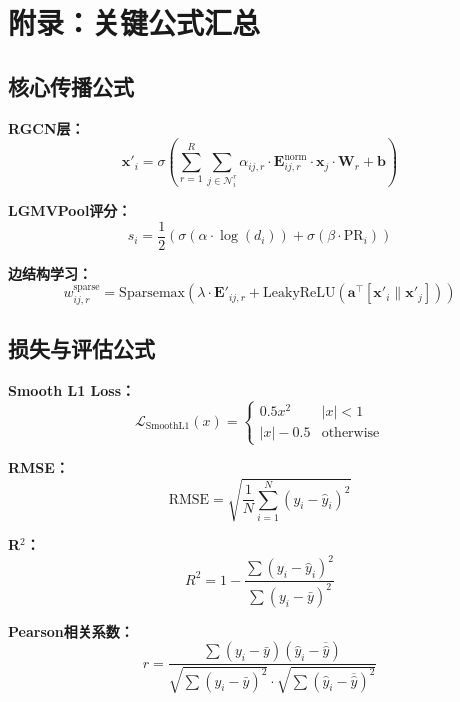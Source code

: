 \section{附录：关键公式汇总}

\subsection{核心传播公式}

\textbf{RGCN层：}
\begin{equation}
\mathbf{x}'_i = \sigma\left( \sum_{r=1}^{R} \sum_{j \in \mathcal{N}_i^r} \alpha_{ij,r} \cdot \mathbf{E}_{ij,r}^{\text{norm}} \cdot \mathbf{x}_j \cdot \mathbf{W}_r + \mathbf{b} \right)
\end{equation}

\textbf{LGMVPool评分：}
\begin{equation}
s_i = \frac{1}{2} \left( \sigma(\alpha \cdot \log(d_i)) + \sigma(\beta \cdot \text{PR}_i) \right)
\end{equation}

\textbf{边结构学习：}
\begin{equation}
w_{ij,r}^{\text{sparse}} = \text{Sparsemax}\left( \lambda \cdot \mathbf{E}'_{ij,r} + \text{LeakyReLU}(\mathbf{a}^{\top}[\mathbf{x}'_i \parallel \mathbf{x}'_j]) \right)
\end{equation}

\subsection{损失与评估公式}

\textbf{Smooth L1 Loss：}
\begin{equation}
\mathcal{L}_{\text{SmoothL1}}(x) = \begin{cases} 0.5 x^2 & |x| < 1 \\ |x| - 0.5 & \text{otherwise} \end{cases}
\end{equation}

\textbf{RMSE：}
\begin{equation}
\text{RMSE} = \sqrt{ \frac{1}{N} \sum_{i=1}^{N} (y_i - \hat{y}_i)^2 }
\end{equation}

\textbf{R$^2$：}
\begin{equation}
R^2 = 1 - \frac{\sum (y_i - \hat{y}_i)^2}{\sum (y_i - \bar{y})^2}
\end{equation}

\textbf{Pearson相关系数：}
\begin{equation}
r = \frac{\sum (y_i - \bar{y})(\hat{y}_i - \overline{\hat{y}})}{\sqrt{\sum (y_i - \bar{y})^2} \cdot \sqrt{\sum (\hat{y}_i - \overline{\hat{y}})^2}}
\end{equation}
